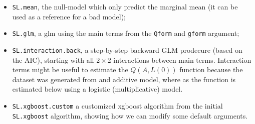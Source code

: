 \documentclass[
]{book}
\providecommand{\tightlist}{%
  \setlength{\itemsep}{0pt}\setlength{\parskip}{0pt}}
\begin{document}
\begin{itemize}
\tightlist
\item
  \texttt{SL.mean}, the null-model which only predict the marginal mean (it can be used as a reference for a bad model);
\item
  \texttt{SL.glm}, a glm using the main terms from the \texttt{Qform} and \texttt{gform} argument;
\item
  \texttt{SL.interaction.back}, a step-by-step backward GLM prodecure (based on the AIC), starting with all \(2 \times 2\) interactions between main terms. Interaction terms might be useful to estimate the \(\bar{Q}(A,L(0))\) function because the dataset was generated from and additive model, where as the function is estimated below using a logistic (multiplicative) model.
\item
  \texttt{SL.xgboost.custom} a customized xgboost algorithm from the initial \texttt{SL.xgboost} algorithm, showing how we can modify some default arguments.
\end{itemize}
\end{document}
